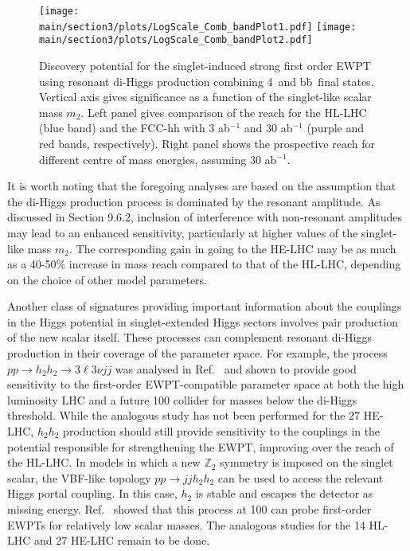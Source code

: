 \begin{figure}[hbtp]
  \begin{center}
    \texttt{[image: \\main/section3/plots/LogScale\_Comb\_bandPlot1.pdf]}
    \texttt{[image: \\main/section3/plots/LogScale\_Comb\_bandPlot2.pdf]}
    \caption{
    Discovery potential for the singlet-induced strong first order EWPT using resonant di-Higgs production combining 4\texttau\ and b\={b}\textgamma\textgamma\ final states\cite{Kotwal:2016tex}. Vertical axis gives significance as a function of the singlet-like scalar mass $m_2$. Left panel gives comparison of the reach for the HL-LHC (blue band) and the FCC-hh with 3 ab$^{-1}$ and 30 ab$^{-1}$ (purple and red bands, respectively). Right panel shows the prospective reach for different centre of mass energies, assuming 30 ab$^{-1}$.    
        }
    \label{fig:ewpt_resdihiggs}
  \end{center}
\end{figure}

It is worth noting that the foregoing analyses are based on the assumption that the di-Higgs production process is dominated by the resonant amplitude. As discussed in Section 9.6.2, inclusion of interference with non-resonant amplitudes may lead to an enhanced sensitivity, particularly at higher values of the singlet-like mass $m_2$. The corresponding gain in going to the HE-LHC may be as much as a 40-50\% increase in mass reach compared to that of the HL-LHC, depending on the choice of other model parameters.

Another class of signatures providing important information about the couplings in the Higgs potential in singlet-extended Higgs sectors involves pair production of the new scalar itself. These processes can complement resonant di-Higgs production in their coverage of the parameter space. For example, the process $p p\rightarrow h_2 h_2 \rightarrow 3\ell 3\nu j j$ was analysed in Ref.~\cite{Chen:2017qcz} and shown to provide good sensitivity to the first-order EWPT-compatible parameter space at both the high luminosity LHC and a future 100 \UTeV collider for masses below the di-Higgs threshold. While the analogous study has not been performed for the 27 \UTeV HE-LHC, $h_2 h_2$ production should still provide sensitivity to the couplings in the potential responsible for strengthening the EWPT, improving over the reach of the HL-LHC. In models in which a new $\mathbb{Z}_2$ symmetry is imposed on the singlet scalar, the VBF-like topology $p p \rightarrow j j h_2 h_2$ can be used to access the relevant Higgs portal coupling. In this case, $h_2$ is stable and escapes the detector as missing energy. Ref.~\cite{Curtin:2014jma} showed that this process at 100 \UTeV can probe first-order EWPTs for relatively low scalar masses. The analogous studies for the 14 \UTeV HL-LHC and 27 \UTeV HE-LHC remain to be done. 

